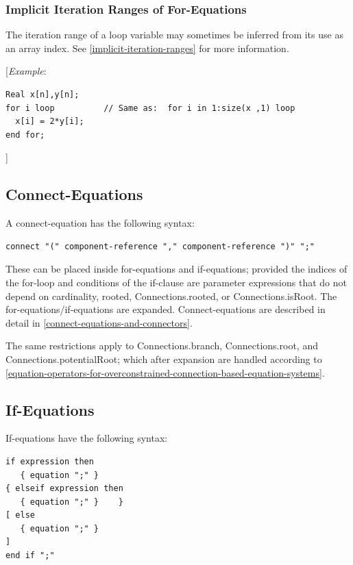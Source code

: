 \documentclass[10pt,a4paper]{report}
\def\doublelabel#1{\label{#1}\hypertarget{#1}{}}
\begin{document}
\subsubsection{Implicit Iteration Ranges of For-Equations}\doublelabel{implicit-iteration-ranges-of-for-equations}

The iteration range of a loop variable may sometimes be inferred from
its use as an array index. See \ref{implicit-iteration-ranges} for more information.

{[}\emph{Example}:
\begin{lstlisting}[language=modelica]
  Real x[n],y[n]; 
for i loop          // Same as:  for i in 1:size(x ,1) loop    
  x[i] = 2*y[i]; 
end for;
\end{lstlisting}
{]}

\subsection{Connect-Equations}\doublelabel{connect-equations}

A connect-equation has the following syntax:
\begin{lstlisting}[language=grammar]
connect "(" component-reference "," component-reference ")" ";"
\end{lstlisting}

These can be placed inside for-equations and if-equations; provided the
indices of the for-loop and conditions of the if-clause are parameter
expressions that do not depend on cardinality, rooted,
Connections.rooted, or Connections.isRoot. The
for-equations/if-equations are expanded. Connect-equations are described
in detail in \ref{connect-equations-and-connectors}.

The same restrictions apply to Connections.branch, Connections.root, and
Connections.potentialRoot; which after expansion are handled according
to \ref{equation-operators-for-overconstrained-connection-based-equation-systems}.

\subsection{If-Equations}\doublelabel{if-equations}

If-equations have the following syntax:
\begin{lstlisting}[language=grammar]
if expression then      
   { equation ";" }    
{ elseif expression then      
   { equation ";" }    }    
[ else      
   { equation ";" }    
]
end if ";" 
\end{lstlisting}
\end{document}
